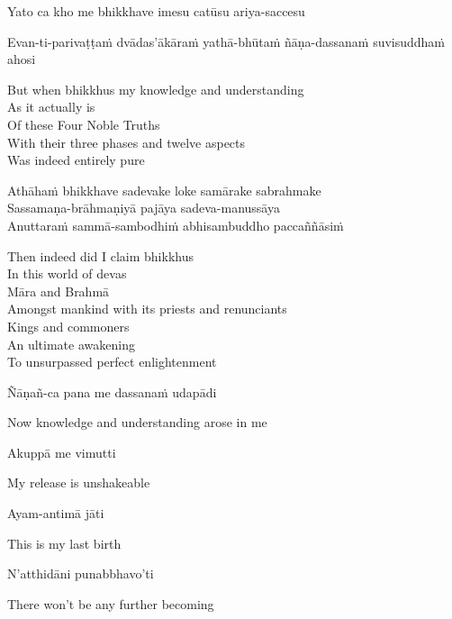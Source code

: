 Yato ca kho me bhikkhave imesu catūsu ariya-saccesu\\
\begin{pali-hang}
  Evan-ti-parivaṭṭaṁ dvādas'ākāraṁ yathā-bhūtaṁ ñāṇa-dassanaṁ suvisuddhaṁ ahosi
\end{pali-hang}

\begin{english-verses}
  But when bhikkhus my knowledge and understanding\\
  As it actually is\\
  Of these Four Noble Truths\\
  With their three phases and twelve aspects\\
  Was indeed entirely pure
\end{english-verses}

Athāhaṁ bhikkhave sadevake loke samārake sabrahmake\\
Sassamaṇa-brāhmaṇiyā pajāya sadeva-manussāya\\
Anuttaraṁ sammā-sambodhiṁ abhisambuddho paccaññāsiṁ

\begin{english-verses}
  Then indeed did I claim bhikkhus\\
  In this world of devas\\
  Māra and Brahmā\\
  Amongst mankind with its priests and renunciants\\
  Kings and commoners\\
  An ultimate awakening\\
  To unsurpassed perfect enlightenment
\end{english-verses}

Ñāṇañ-ca pana me dassanaṁ udapādi

\begin{english}
  Now knowledge and understanding arose in me
\end{english}

Akuppā me vimutti

\begin{english}
  My release is unshakeable
\end{english}

Ayam-antimā jāti

\begin{english}
  This is my last birth
\end{english}

N'atthidāni punabbhavo'ti

\begin{english}
  There won't be any further becoming
\end{english}

